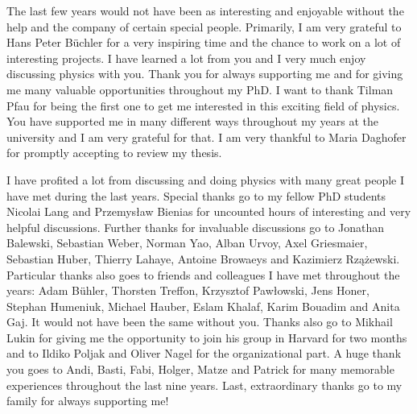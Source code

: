 
The last few years would not have been as interesting and enjoyable without the help and the company of certain special people.
Primarily, I am very grateful to Hans Peter Büchler for a very inspiring time and the chance to work on a lot of interesting projects.
I have learned a lot from you and I very much enjoy discussing physics with you.
Thank you for always supporting me and for giving me many valuable opportunities throughout my PhD.
I want to thank Tilman Pfau for being the first one to get me interested in this exciting field of physics.
You have supported me in many different ways throughout my years at the university and I am very grateful for that.
I am very thankful to Maria Daghofer for promptly accepting to review my thesis.

I have profited a lot from discussing and doing physics with many great people I have met during the last years.
Special thanks go to my fellow PhD students Nicolai Lang and Przemysław Bienias for uncounted hours of interesting and very helpful discussions.
Further thanks for invaluable discussions go to Jonathan Balewski, Sebastian Weber, Norman Yao, Alban Urvoy, Axel Griesmaier, Sebastian Huber, Thierry Lahaye, Antoine Browaeys and Kazimierz Rzążewski.
Particular thanks also goes to friends and colleagues I have met throughout the years: Adam Bühler, Thorsten Treffon, Krzysztof Pawłowski, Jens Honer, Stephan Humeniuk, Michael Hauber, Eslam Khalaf, Karim Bouadim and Anita Gaj.
It would not have been the same without you.
Thanks also go to Mikhail Lukin for giving me the opportunity to join his group in Harvard for two months and to Ildiko Poljak and Oliver Nagel for the organizational part.
A huge thank you goes to Andi, Basti, Fabi, Holger, Matze and Patrick for many memorable experiences throughout the last nine years.
Last, extraordinary thanks go to my family for always supporting me!
